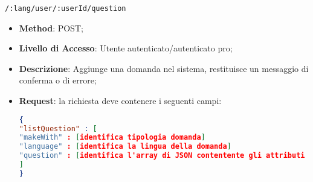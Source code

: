 	
	\item \texttt{/:lang/user/:userId/question}
		\begin{itemize}
			\item \textbf{Method}: POST;
			\item \textbf{Livello di Accesso}: Utente autenticato/autenticato pro;
			\item \textbf{Descrizione}: Aggiunge una domanda nel sistema, restituisce un messaggio di conferma o di errore;
			\item \textbf{Request}: la richiesta deve contenere i seguenti campi:
\begin{lstlisting}[language=json,firstnumber=1]
{
"listQuestion" : [ 
"makeWith" : [identifica tipologia domanda]
"language" : [identifica la lingua della domanda]
"question" : [identifica l'array di JSON contentente gli attributi che formano una domanda]
]
}
\end{lstlisting}
		\end{itemize}